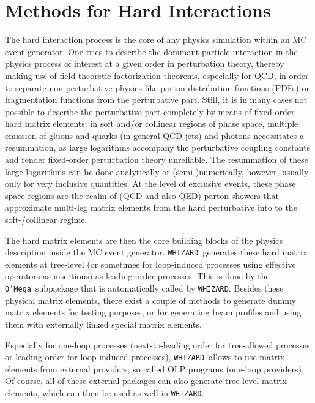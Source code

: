 \documentclass[12pt]{book}
\newcommand{\ttt}[1]{\texttt{#1}}
\newcommand{\whizard}{\ttt{WHIZARD}}
\newcommand{\oMega}{\ttt{O'Mega}}
\begin{document}

\chapter{Methods for Hard Interactions}
\label{chap:hardint}

The hard interaction process is the core of any physics simulation
within an MC event generator. One tries to describe the dominant
particle interaction in the physics process of interest at a given
order in perturbation theory, thereby making use of field-theoretic
factorization theorems, especially for QCD, in order to separate
non-perturbative physics like parton distribution functions (PDFs) or
fragmentation functions from the perturbative part. Still, it is in
many cases not possible to describe the perturbative part completely
by means of fixed-order hard matrix elements: in soft and/or collinear
regions of phase space, multiple emission of gluons and quarks (in
general QCD jets) and photons necessitates a resummation, as large
logarithms accompany the perturbative coupling constants and render
fixed-order perturbation theory unreliable. The resummation of these
large logarithms can be done analytically or (semi-)numerically,
however, usually only for very inclusive quantities. At the level of
exclusive events, these phase space regions are the realm of (QCD and
also QED) parton showers that approximate multi-leg matrix elements
from the hard perturbative into to the soft-/collinear regime.

The hard matrix elements are then the core building blocks of the
physics description inside the MC event generator. \whizard\ generates
these hard matrix elements at tree-level (or sometimes for
loop-induced processes using effective operators as insertions) as
leading-order processes. This is done by the \oMega\ subpackage that
is automatically called by \whizard. Besides these physical matrix
elements, there exist a couple of methods to generate dummy matrix
elements for testing purposes, or for generating beam profiles and
using them with externally linked special matrix elements.

Especially for one-loop processes (next-to-leading order for
tree-allowed processes or leading-order for loop-induced processes),
\whizard\ allows to use matrix elements from external providers, so
called OLP programs (one-loop providers). Of course, all of these
external packages can also generate tree-level matrix elements, which
can then be used as well in \whizard.
\end{document}
